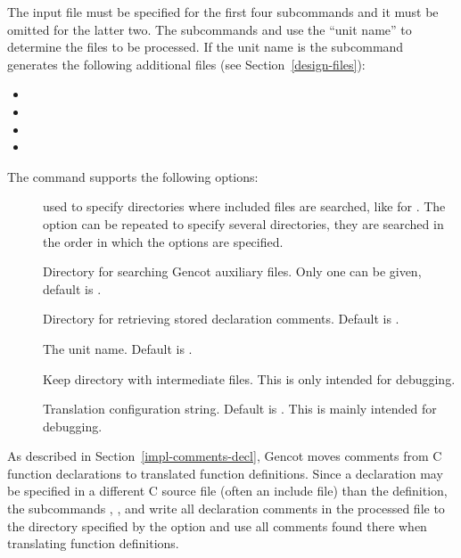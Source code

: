 The input file  must be specified for the first four subcommands and it must be omitted for the latter two.
The subcommands  and  use the ``unit name'' to determine the files to be processed.
If the unit name is  the subcommand  generates the following additional files (see Section~\ref{design-files}):
\begin{itemize}
\item {}
\item {}
\item {}
\item {}
\end{itemize}

The  command supports the following options:
\begin{description}
\item[] used to specify directories where included files are searched, like for . The 
option can be repeated to specify several directories, they are searched in the order in which the options
are specified.

\item[] Directory for searching Gencot auxiliary files. Only one can be given, default is .

\item[] Directory for retrieving stored declaration comments. Default is .

\item[] The unit name. Default is .

\item[] Keep directory with intermediate files. This is only intended for debugging.

\item[] Translation configuration string. Default is . This is mainly intended for debugging.

\end{description}

As described in Section~\ref{impl-comments-decl}, Gencot moves comments from C function declarations to translated function
definitions. Since a declaration may be specified in a different C source file (often an include file) than the definition, 
the subcommands , , and  write all declaration comments in the processed file to
the directory specified by the  option and use all comments found there when translating function definitions.


